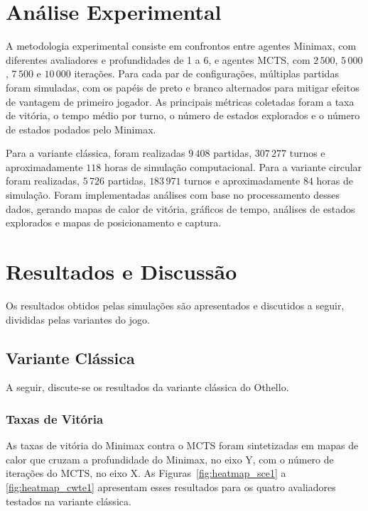 \documentclass[12pt]{article}
\begin{document}
\section{Análise Experimental}
 
A metodologia experimental consiste em confrontos entre agentes Minimax, com diferentes avaliadores e profundidades de 1 a 6, e agentes MCTS, com $2\,500$, $5\,000$,
$7\,500$ e $10\,000$ iterações. Para cada par de configurações, múltiplas partidas foram
simuladas, com os papéis de preto e branco alternados para mitigar efeitos de vantagem de
primeiro jogador. As principais métricas coletadas foram a taxa de vitória, o tempo médio por
turno, o número de estados explorados e o número de estados podados pelo Minimax.
 
Para a variante clássica, foram realizadas $9\,408$ partidas, $307\,277$ turnos e aproximadamente
$118$ horas de simulação computacional. Para a variante circular foram realizadas, $5\,726$
partidas, $183\,971$ turnos e aproximadamente $84$ horas de simulação. Foram implementadas análises
com base no processamento desses dados, gerando mapas de calor de vitória,
gráficos de tempo, análises de estados explorados e mapas de posicionamento e captura.
 
\section{Resultados e Discussão}
Os resultados obtidos pelas simulações são apresentados e discutidos a seguir, divididas pelas variantes do jogo.
 
\subsection{Variante Clássica}
A seguir, discute-se os resultados da variante clássica do Othello.
\subsubsection{Taxas de Vitória}
 
As taxas de vitória do Minimax contra o MCTS foram sintetizadas em mapas de calor que cruzam
a profundidade do Minimax, no eixo Y, com o número de iterações do MCTS, no eixo X. As
Figuras~\ref{fig:heatmap_sce1} a \ref{fig:heatmap_cwte1} apresentam esses resultados para os
quatro avaliadores testados na variante clássica.
 
\end{document}
